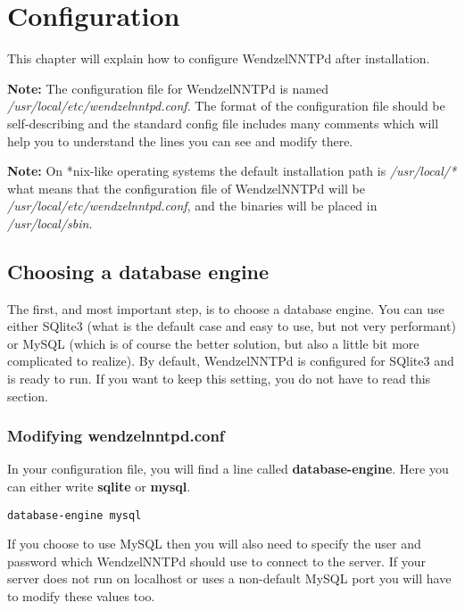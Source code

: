\chapter{Configuration}

This chapter will explain how to configure WendzelNNTPd after installation.

{\bf Note:} The configuration file for WendzelNNTPd is named {\it /usr/local/etc/wendzelnntpd.conf}. The format of the configuration file should be self-describing and the standard config file includes many comments which will help you to understand the lines you can see and modify there.

{\bf Note:} On *nix-like operating systems the default installation path is {\it /usr/local/*} what means that the configuration file of WendzelNNTPd will be {\it /usr/local/etc/wendzelnntpd.conf}, and the binaries will be placed in {\it /usr/local/sbin}. %

\section{Choosing a database engine}

The first, and most important step, is to choose a database engine. You can use either SQlite3 (what is the default case and easy to use, but not very performant) or MySQL (which is of course the better solution, but also a little bit more complicated to realize). By default, WendzelNNTPd is configured for SQlite3 and is ready to run. If you want to keep this setting, you do not have to read this section.

\subsection{Modifying wendzelnntpd.conf}

In your configuration file, you will find a line called {\bf database-engine}. Here you can either write {\bf sqlite} or {\bf mysql}.

\begin{verbatim}
database-engine mysql
\end{verbatim}

If you choose to use MySQL then you will also need to specify the user and password which WendzelNNTPd should use to connect to the server. If your server does not run on localhost or uses a non-default MySQL port you will have to modify these values too.

